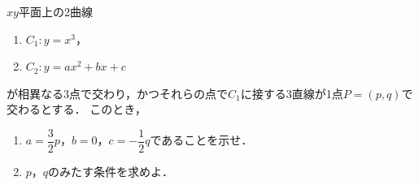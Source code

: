 \documentclass[../../main.tex]{subfiles}
\begin{document}
$xy$平面上の2曲線
\begin{enumerate}
  \item []$C_1:y=x^3$，
  \item []$C_2:y=ax^2+bx+c$
\end{enumerate}
が相異なる3点で交わり，かつそれらの点で$C_1$に接する3直線が1点$P=(p,q)$で交わるとする．
このとき，
\begin{enumerate}
  \item $\displaystyle a=\dfrac{3}{2}p$，$b=0$，$\displaystyle c=-\dfrac{1}{2}q$であることを示せ．
  \item $p$，$q$のみたす条件を求めよ．
\end{enumerate}
\end{document}
